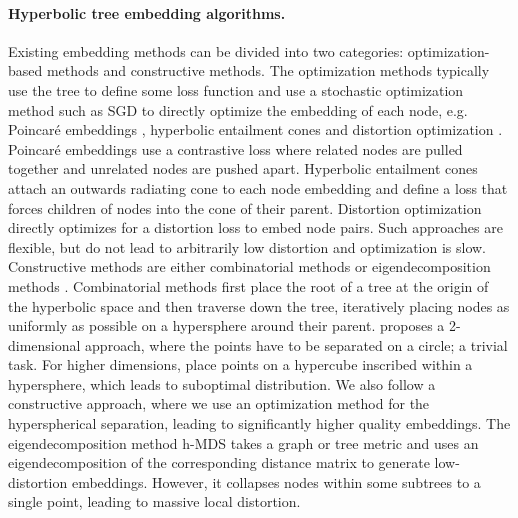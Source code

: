 \paragraph{Hyperbolic tree embedding algorithms.}
Existing embedding methods can be divided into two categories: optimization-based methods and constructive methods. The optimization methods typically use the tree to define some loss function and use a stochastic optimization method such as SGD to directly optimize the embedding of each node, e.g. Poincaré embeddings \citep{nickel2017poincare}, hyperbolic entailment cones \citep{ganea2018hyperbolic} and distortion optimization \citep{sala2018representation,yu2022skin}. Poincaré embeddings use a contrastive loss where related nodes are pulled together and unrelated nodes are pushed apart. Hyperbolic entailment cones attach an outwards radiating cone to each node embedding and define a loss that forces children of nodes into the cone of their parent. Distortion optimization directly optimizes for a distortion loss to embed node pairs. Such approaches are flexible, but do not lead to arbitrarily low distortion and optimization is slow. Constructive methods are either combinatorial methods \citep{sarkar2011low,sala2018representation} or eigendecomposition methods \citep{sala2018representation}. Combinatorial methods first place the root of a tree at the origin of the hyperbolic space and then traverse down the tree, iteratively placing nodes as uniformly as possible on a hypersphere around their parent. \citep{sarkar2011low} proposes a 2-dimensional approach, where the points have to be separated on a circle; a trivial task. For higher dimensions, \citep{sala2018representation} place points on a hypercube inscribed within a hypersphere, which leads to suboptimal distribution. We also follow a constructive approach, where we use an optimization method for the hyperspherical separation, leading to significantly higher quality embeddings. The eigendecomposition method h-MDS \citep{sala2018representation} takes a graph or tree metric and uses an eigendecomposition of the corresponding distance matrix to generate low-distortion embeddings. However, it collapses nodes within some subtrees to a single point, leading to massive local distortion.

\vspace{-0.15cm}

